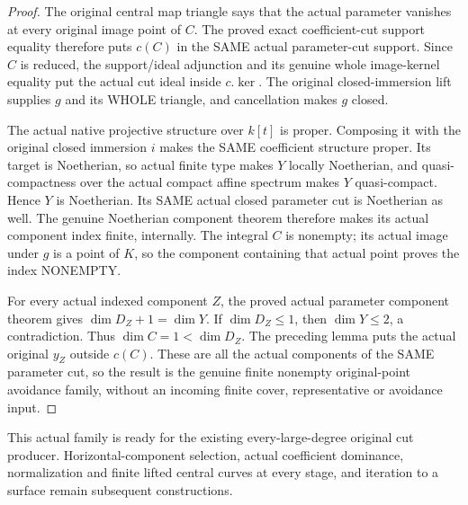 \begin{proof}
The original central map triangle says that the actual parameter
vanishes at every original image point of $C$. The proved exact
coefficient-cut support equality therefore puts $c(C)$ in the SAME
actual parameter-cut support. Since $C$ is reduced, the support/ideal
adjunction and its genuine whole image-kernel equality put the actual
cut ideal inside $c.\ker$. The original closed-immersion lift supplies
$g$ and its WHOLE triangle, and cancellation makes $g$ closed.

The actual native projective structure over $k[t]$ is proper. Composing
it with the original closed immersion $i$ makes the SAME coefficient
structure proper. Its target is Noetherian, so actual finite type
makes $Y$ locally Noetherian, and quasi-compactness over the actual
compact affine spectrum makes $Y$ quasi-compact. Hence $Y$ is
Noetherian. Its SAME actual closed parameter cut is Noetherian as
well. The genuine Noetherian component theorem therefore makes its
actual component index finite, internally. The integral $C$ is
nonempty; its actual image under $g$ is a point of $K$, so the
component containing that actual point proves the index NONEMPTY.

For every actual indexed component $Z$, the proved actual parameter
component theorem gives $\dim D_Z+1=\dim Y$. If $\dim D_Z\le1$,
then $\dim Y\le2$, a contradiction. Thus $\dim C=1<\dim D_Z$.
The preceding lemma puts the actual original $y_Z$ outside $c(C)$.
These are all the actual components of the SAME parameter cut, so the
result is the genuine finite nonempty original-point avoidance family,
without an incoming finite cover, representative or avoidance input.
\end{proof}

This actual family is ready for the existing every-large-degree original
cut producer. Horizontal-component selection, actual coefficient
dominance, normalization and finite lifted central curves at every
stage, and iteration to a surface remain subsequent constructions.
